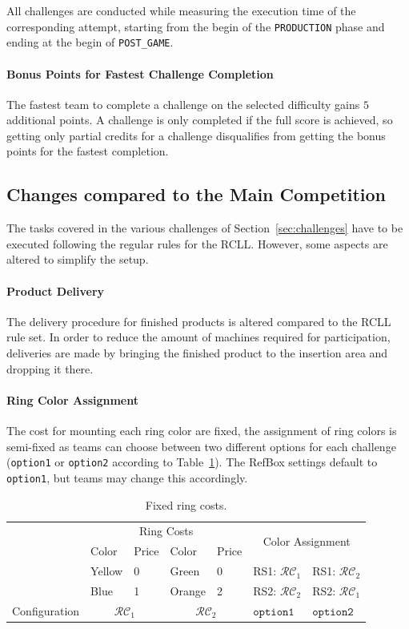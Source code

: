 \documentclass[12pt,twoside]{article}
\newcommand{\refsec}[1]{Section~\ref{#1}}
\newcommand{\reftab}[1]{Table~\ref{#1}}
\begin{document}
All challenges are conducted while measuring the execution time of the
corresponding attempt, starting from the begin of the \texttt{PRODUCTION} phase
and ending at the begin of \texttt{POST\_GAME}.

\paragraph{Bonus Points for Fastest Challenge Completion}
The fastest team to complete a challenge on the selected difficulty gains $5$
additional points. A challenge is only completed if the full score is achieved,
so getting only partial credits for a challenge disqualifies from getting the
bonus points for the fastest completion.

\subsection{Changes compared to the Main Competition}
The tasks covered in the various challenges of \refsec{sec:challenges} have to
be executed following the regular rules for the \ac{RCLL}.
However, some aspects are altered to simplify the setup.

\paragraph{Product Delivery}
The delivery procedure for finished products is altered compared to the
\ac{RCLL} rule set. In order to reduce the amount of machines required
for participation, deliveries are made by bringing the finished product
to the insertion area and dropping it there.

\paragraph{Ring Color Assignment}
The cost for mounting each ring color are fixed, the assignment of ring colors
is semi-fixed as teams can choose between two different options for each
challenge (\texttt{option1} or \texttt{option2} according to
\reftab{tab:ring-costs}).
The RefBox settings default to \texttt{option1}, but teams may change this
accordingly.

\newcommand{\colconfig}{\mathcal{RC}}
\begin{table}[!htb]
 \centering
 \begin{tabular}{l|l|l||l|l||l|l}
  & \multicolumn{4}{c||}{Ring Costs}
  & \multicolumn{2}{c}{\multirow{2}{*}{Color Assignment }}\\\cline{2-5}
  & Color  & Price & Color  & Price & \multicolumn{2}{c}{}\\\cline{2-7}
  & Yellow & 0 & Green & 0
  & RS1: $\colconfig_1$ & RS1: $\colconfig_2$ \\
  & Blue  & 1 & Orange & 2
  & RS2: $\colconfig_2$ & RS2: $\colconfig_1$ \\\hline\hline
  Configuration & \multicolumn{2}{c||}{$\colconfig_1$}
  & \multicolumn{2}{c||}{$\colconfig_2$}
  & $\texttt{option1}$ & $\texttt{option2}$\\
 \end{tabular}
 \caption{Fixed ring costs.}
 \label{tab:ring-costs}
\end{table}
\end{document}
